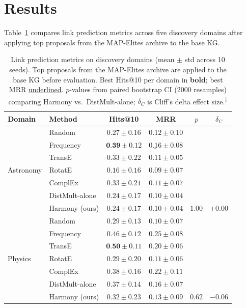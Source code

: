 \section{Results}\label{sec:results}

Table~\ref{tab:metrics} compares link prediction metrics across five discovery domains
after applying top proposals from the MAP-Elites archive to the base KG.

\begin{table}[t]
\centering
\caption{Link prediction metrics on discovery domains (mean $\pm$ std across
10 seeds).  Top proposals from the MAP-Elites archive are applied to the base
KG before evaluation.  Best Hits@10 per domain in \textbf{bold};
best MRR \underline{underlined}.  $p$-values from paired bootstrap CI
(2000 resamples) comparing Harmony vs.\ DistMult-alone; $\delta_C$ is Cliff's
delta effect size.\textsuperscript{$\dagger$}}\label{tab:metrics}
\begin{tabular}{llcccc}
\toprule
Domain & Method & Hits@10 & MRR & $p$ & $\delta_C$ \\
\midrule
\multirow{7}{*}{Astronomy}
  & Random          & $0.27 \pm 0.16$ & $0.12 \pm 0.10$ & & \\
  & Frequency       & $\textbf{0.39} \pm 0.12$ & $\underline{0.16} \pm 0.08$ & & \\
  & TransE          & $0.33 \pm 0.22$ & $0.11 \pm 0.05$ & & \\
  & RotatE          & $0.16 \pm 0.16$ & $0.09 \pm 0.07$ & & \\
  & ComplEx         & $0.33 \pm 0.21$ & $0.11 \pm 0.07$ & & \\
  & DistMult-alone  & $0.24 \pm 0.17$ & $0.10 \pm 0.04$ & & \\
  & Harmony (ours)  & $0.24 \pm 0.17$ & $0.10 \pm 0.04$ & $1.00$ & $+0.00$ \\
\midrule
\multirow{7}{*}{Physics}
  & Random          & $0.29 \pm 0.13$ & $0.10 \pm 0.07$ & & \\
  & Frequency       & $0.46 \pm 0.12$ & $\underline{0.25} \pm 0.08$ & & \\
  & TransE          & $\textbf{0.50} \pm 0.11$ & $0.20 \pm 0.06$ & & \\
  & RotatE          & $0.29 \pm 0.20$ & $0.11 \pm 0.06$ & & \\
  & ComplEx         & $0.38 \pm 0.16$ & $0.22 \pm 0.11$ & & \\
  & DistMult-alone  & $0.37 \pm 0.14$ & $0.16 \pm 0.07$ & & \\
  & Harmony (ours)  & $0.32 \pm 0.23$ & $0.13 \pm 0.09$ & $0.62$ & $-0.06$ \\

\end{tabular}
\end{table}
